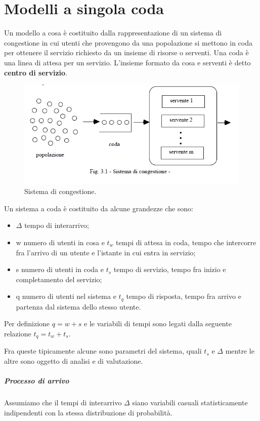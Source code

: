 \chapter{Modelli a singola coda}
Un modello a cosa è costituito dalla rappresentazione di un sistema di congestione in cui utenti che provengono da una popolazione si mettono in coda per ottenere il servizio richiesto da un insieme di risorse o serventi. Una coda è una linea di attesa per un servizio. L'insieme formato da cosa e serventi è detto \textbf{centro di servizio}. 

\begin{figure}[H]
	\centering
    \includegraphics[width=15cm, keepaspectratio]{img/modello_coda.png}
	\caption{Sistema di congestione.}\label{fig:modello_coda}
\end{figure}
Un sistema a coda è costituito da alcune grandezze che sono:
\begin{itemize}
    \item $\Delta$ tempo di interarrivo;
    \item w numero di utenti in cosa e $t_w$ tempi di attesa in coda, tempo che intercorre fra l'arrivo di un utente e l'istante in cui entra in servizio;
    \item s numero di utenti in coda e $t_s$ tempo di servizio, tempo fra inizio e completamento del servizio;
    \item q numero di utenti nel sistema e $t_q$ tempo di risposta, tempo fra arrivo e partenza dal sistema dello stesso utente.
\end{itemize}
Per definizione $q= w+s$ e le variabili di tempi sono legati dalla seguente relazione $t_q = t_w + t_s$.

Fra queste tipicamente alcune sono parametri del sistema, quali $t_s$ e $\Delta$ mentre le altre sono oggetto di analisi e di valutazione.
\paragraph{Processo di arrivo}
Assumiamo che il tempi di interarrivo $ \Delta$ siano variabili casuali statisticamente indipendenti con la stessa distribuzione di probabilità.
